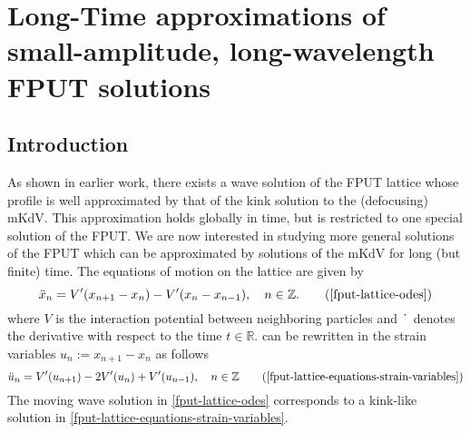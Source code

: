 \chapter{Long-Time approximations of small-amplitude, long-wavelength  FPUT solutions}
\label{chp:long-time-stability}
\pagestyle{myheadings}

\section{Introduction}

As shown in earlier work, there exists a wave solution of the FPUT lattice whose profile is well approximated by that of the kink solution to the (defocusing) mKdV. This approximation holds globally in time, but is restricted to one special solution of the FPUT. We are now interested in studying more general solutions of the FPUT which can be approximated by solutions of the mKdV for long (but finite) time. The equations of motion on the lattice are given by 
\begin{equation*}
	\ddot x_n = V'(x_{n+1} - x_n) - V'(x_n - x_{n-1}), \quad n \in \Z. \tag{\ref{fput-lattice-odes}}
\end{equation*}
where \(V\) is the interaction potential between neighboring particles and \(\dot{\hspace{0.5em}}\) denotes the derivative with respect to the time \(t\in \mathbb{R}\).  can be rewritten in the strain variables \(u_n := x_{n+1} - x_n\) as follows
\begin{equation*}
	\ddot{u}_n = V'(u_{n+1}) - 2 V'(u_n) + V'(u_{n-1}), \quad n \in \Z \tag{\ref{fput-lattice-equations-strain-variables}}
\end{equation*}
The moving wave solution in \cref{fput-lattice-odes} corresponds to a kink-like solution in \cref{fput-lattice-equations-strain-variables}.

